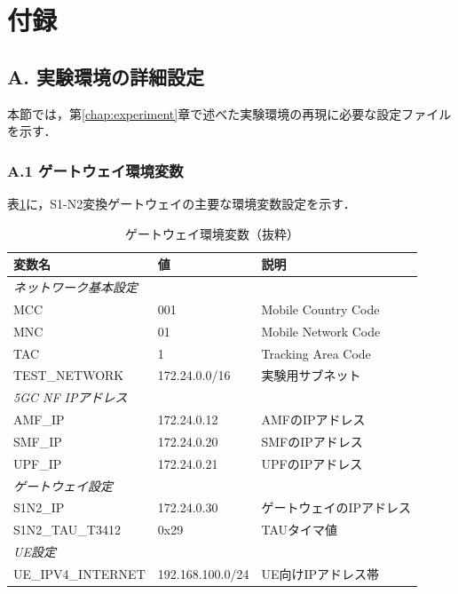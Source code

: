 \chapter*{付録}
\label{appendix}

\section*{A. 実験環境の詳細設定}

本節では，第\ref{chap:experiment}章で述べた実験環境の再現に必要な設定ファイルを示す．

\subsection*{A.1 ゲートウェイ環境変数}

表\ref{tab:gateway_env}に，S1-N2変換ゲートウェイの主要な環境変数設定を示す．

\begin{table}[htbp]
\centering
\caption{ゲートウェイ環境変数（抜粋）}
\label{tab:gateway_env}
\small
\begin{tabular}{|l|l|l|}
\hline
\textbf{変数名} & \textbf{値} & \textbf{説明} \\
\hline
\hline
\multicolumn{3}{|l|}{\textit{ネットワーク基本設定}} \\
\hline
MCC & 001 & Mobile Country Code \\
MNC & 01 & Mobile Network Code \\
TAC & 1 & Tracking Area Code \\
TEST\_NETWORK & 172.24.0.0/16 & 実験用サブネット \\
\hline
\multicolumn{3}{|l|}{\textit{5GC NF IPアドレス}} \\
\hline
AMF\_IP & 172.24.0.12 & AMFのIPアドレス \\
SMF\_IP & 172.24.0.20 & SMFのIPアドレス \\
UPF\_IP & 172.24.0.21 & UPFのIPアドレス \\
\hline
\multicolumn{3}{|l|}{\textit{ゲートウェイ設定}} \\
\hline
S1N2\_IP & 172.24.0.30 & ゲートウェイのIPアドレス \\
S1N2\_TAU\_T3412 & 0x29 & TAUタイマ値 \\
\hline
\multicolumn{3}{|l|}{\textit{UE設定}} \\
\hline
UE\_IPV4\_INTERNET & 192.168.100.0/24 & UE向けIPアドレス帯 \\
\hline
\end{tabular}
\end{table}

